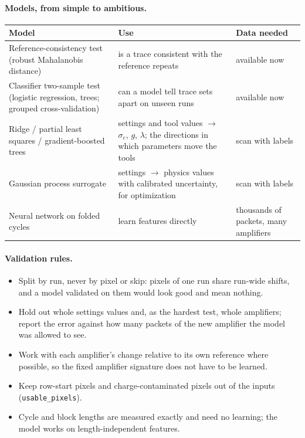 \documentclass[11pt]{article}
\newcommand{\code}[1]{\texttt{#1}}
\begin{document}
\paragraph{Models, from simple to ambitious.}
\begin{center}
\begin{tabular}{p{}p{}p{}}
\toprule
Model & Use & Data needed \\
\midrule
Reference-consistency test (robust Mahalanobis distance) & is a trace consistent with the reference repeats & available now \\
Classifier two-sample test (logistic regression, trees; grouped cross-validation) & can a model tell trace sets apart on unseen runs & available now \\
Ridge / partial least squares / gradient-boosted trees & settings and tool values $\rightarrow$ $\sigma_e$, $g$, $\lambda$; the directions in which parameters move the tools & scan with labels \\
Gaussian process surrogate & settings $\rightarrow$ physics values with calibrated uncertainty, for optimization & scan with labels \\
Neural network on folded cycles & learn features directly & thousands of packets, many amplifiers \\
\bottomrule
\end{tabular}
\end{center}

\paragraph{Validation rules.}
\begin{itemize}
  \item Split by run, never by pixel or skip: pixels of one run share run-wide shifts, and a model validated on them would look good
        and mean nothing.
  \item Hold out whole settings values and, as the hardest test, whole amplifiers; report the error against how many packets of the
        new amplifier the model was allowed to see.
  \item Work with each amplifier's change relative to its own reference where possible, so the fixed amplifier signature
        does not have to be learned.
  \item Keep row-start pixels and charge-contaminated pixels out of the inputs (\code{usable\_pixels}).
  \item Cycle and block lengths are measured exactly and need no learning; the model works on length-independent features.
\end{itemize}
\end{document}
